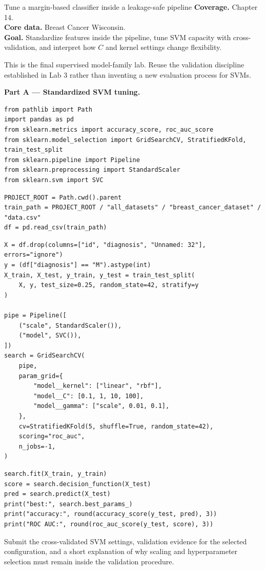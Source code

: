 
\begin{labproject}{Tune a margin-based classifier inside a leakage-safe pipeline}
\textbf{Coverage.} Chapter 14.\\
\textbf{Core data.} Breast Cancer Wisconsin.\\
\textbf{Goal.} Standardize features inside the pipeline, tune SVM capacity with cross-validation, and interpret how $C$ and kernel settings change flexibility.

\begin{labmode}
This is the final supervised model-family lab. Reuse the validation discipline established in Lab 3 rather than inventing a new evaluation process for SVMs.
\end{labmode}

\medskip\noindent\textbf{Part A --- Standardized SVM tuning.}\par
\begin{lstlisting}[style=mlpython]
from pathlib import Path
import pandas as pd
from sklearn.metrics import accuracy_score, roc_auc_score
from sklearn.model_selection import GridSearchCV, StratifiedKFold, train_test_split
from sklearn.pipeline import Pipeline
from sklearn.preprocessing import StandardScaler
from sklearn.svm import SVC
\end{lstlisting}

\begin{lstlisting}[style=mlpython]
PROJECT_ROOT = Path.cwd().parent
train_path = PROJECT_ROOT / "all_datasets" / "breast_cancer_dataset" / "data.csv"
df = pd.read_csv(train_path)
\end{lstlisting}

\begin{lstlisting}[style=mlpython]
X = df.drop(columns=["id", "diagnosis", "Unnamed: 32"], errors="ignore")
y = (df["diagnosis"] == "M").astype(int)
X_train, X_test, y_train, y_test = train_test_split(
    X, y, test_size=0.25, random_state=42, stratify=y
)

pipe = Pipeline([
    ("scale", StandardScaler()),
    ("model", SVC()),
])
search = GridSearchCV(
    pipe,
    param_grid={
        "model__kernel": ["linear", "rbf"],
        "model__C": [0.1, 1, 10, 100],
        "model__gamma": ["scale", 0.01, 0.1],
    },
    cv=StratifiedKFold(5, shuffle=True, random_state=42),
    scoring="roc_auc",
    n_jobs=-1,
)
\end{lstlisting}

\begin{lstlisting}[style=mlpython]
search.fit(X_train, y_train)
score = search.decision_function(X_test)
pred = search.predict(X_test)
print("best:", search.best_params_)
print("accuracy:", round(accuracy_score(y_test, pred), 3))
print("ROC AUC:", round(roc_auc_score(y_test, score), 3))
\end{lstlisting}

\end{labproject}

\begin{labdeliverable}
Submit the cross-validated SVM settings, validation evidence for the selected configuration, and a short explanation of why scaling and hyperparameter selection must remain inside the validation procedure.
\end{labdeliverable}
